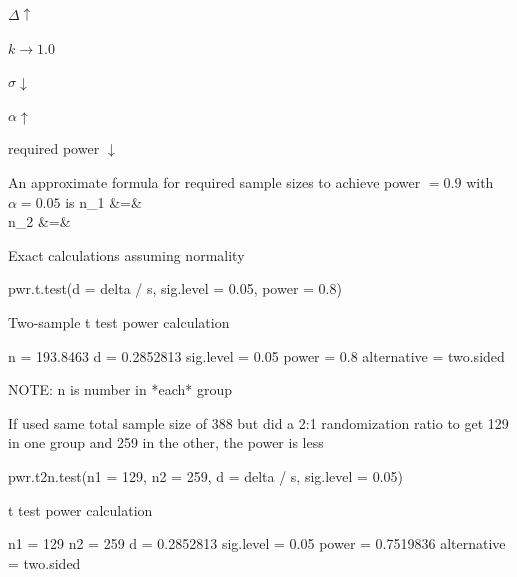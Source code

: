  \bi
 \item $\Delta \uparrow$
 \item $k \rightarrow 1.0$
 \item $\sigma \downarrow$
 \item $\alpha \uparrow$
 \item required power $\downarrow$
 \ei
\item An approximate formula for required sample sizes to achieve
  power $=0.9$ with $\alpha=0.05$ is
\beqa
n_{1} &=&  \\
n_{2} &=& 
\eeqa
\item Exact calculations assuming normality
\begin{Schunk}
\begin{Sinput}
pwr.t.test(d = delta / s, sig.level = 0.05, power = 0.8)
\end{Sinput}
\begin{Soutput}

     Two-sample t test power calculation 

              n = 193.8463
              d = 0.2852813
      sig.level = 0.05
          power = 0.8
    alternative = two.sided

NOTE: n is number in *each* group
\end{Soutput}
\end{Schunk}
\item If used same total sample size of 388 but did a 2:1
  randomization ratio to get 129 in one group and 259 in the other,
  the power is less
\begin{Schunk}
\begin{Sinput}
pwr.t2n.test(n1 = 129, n2 = 259, d = delta / s, sig.level = 0.05)
\end{Sinput}
\begin{Soutput}

     t test power calculation 

             n1 = 129
             n2 = 259
              d = 0.2852813
      sig.level = 0.05
          power = 0.7519836
    alternative = two.sided
\end{Soutput}
\end{Schunk}
\ei


